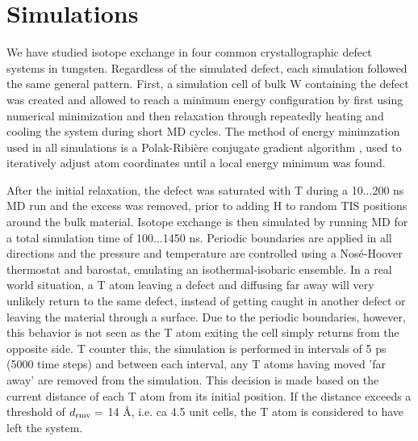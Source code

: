 \chapter{Simulations}

We have studied isotope exchange in four common crystallographic defect systems in tungsten. 
Regardless of the simulated defect, each simulation followed the same general pattern. 
First, a simulation cell of bulk W containing the defect was created and allowed to reach a minimum energy configuration by first using numerical minimization and then relaxation through repeatedly heating and cooling the system during short MD cycles. 
The method of energy minimzation used in all simulations is a Polak-Ribi\`{e}re conjugate gradient algorithm \cite{polak1969note}, used to iteratively adjust atom coordinates until a local energy minimum was found. 

After the initial relaxation, the defect was saturated with T during a 10...200 ns MD run and the excess was removed, prior to adding H to random TIS positions around the bulk material. 
Isotope exchange is then simulated by running MD for a total simulation time of 100...1450 ns. 
Periodic boundaries are applied in all directions and the pressure and temperature are controlled using a Nos\'{e}-Hoover thermostat and barostat, emulating an isothermal-isobaric ensemble. 
In a real world situation, a T atom leaving a defect and diffusing far away will very unlikely return to the same defect, instead of getting caught in another defect or leaving the material through a surface. 
Due to the periodic boundaries, however, this behavior is not seen as the T atom exiting the cell simply returns from the opposite side. 
T counter this, the simulation is performed in intervals of 5 ps (5000 time steps) and between each interval, any T atoms having moved 'far away' are removed from the simulation. 
This decision is made based on the current distance of each T atom from its initial position. 
If the distance exceeds a threshold of $d_{\rm{rmv}} =$ 14 \AA, i.e. ca 4.5 unit cells, the T atom is considered to have left the system. 




